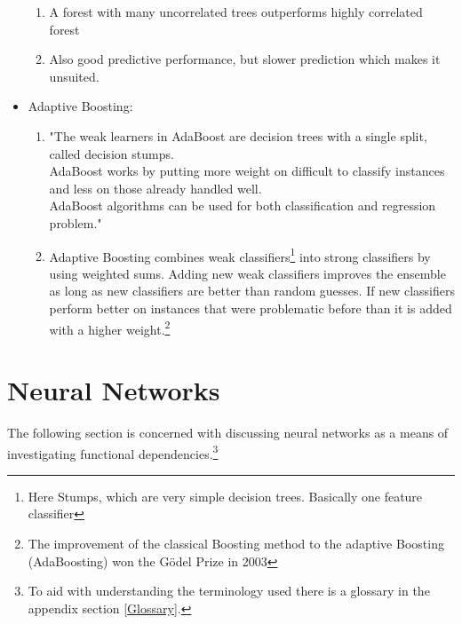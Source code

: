 \begin{itemize}
\begin{enumerate}
				\item A forest with many uncorrelated trees outperforms highly correlated forest\\
				\item Also good predictive performance, but slower prediction which makes it unsuited.
			\end{enumerate}
		\item Adaptive Boosting:\\
			\begin{enumerate}
				\item "The weak learners in AdaBoost are decision trees with a single split, called decision stumps.\\				
				AdaBoost works by putting more weight on difficult to classify instances and less on those already handled well.\\				
				AdaBoost algorithms can be used for both classification and regression problem."\\
				\item Adaptive Boosting combines weak classifiers\footnote{Here Stumps, which are very simple decision trees. Basically one feature classifier} into strong classifiers by using weighted sums. Adding new weak classifiers improves the ensemble as long as new classifiers are better than random guesses. If new classifiers perform better on instances that were problematic before than it is added with a higher weight.\footnote{The improvement of the classical Boosting method to the adaptive Boosting (AdaBoosting) won the Gödel Prize in 2003}
			\end{enumerate}
	\end{itemize}
	\section{Neural Networks}
		The following section is concerned with discussing neural networks as a means of investigating functional dependencies.\footnote{To aid with understanding the terminology used there is a glossary in the appendix section \ref{Glossary}.}\\		
